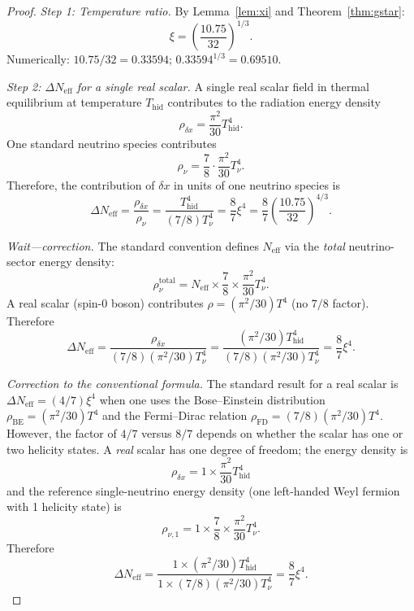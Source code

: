 \documentclass[12pt]{article}
\theoremstyle{plain}
\theoremstyle{definition}
\numberwithin{equation}{section}
\newcommand{\eff}{\mathrm{eff}}
\newcommand{\hid}{\mathrm{hid}}
\begin{document}
\begin{proof}
\emph{Step 1: Temperature ratio.}
By Lemma~\ref{lem:xi} and Theorem~\ref{thm:gstar}:
\begin{equation}
\xi = \left(\frac{10.75}{32}\right)^{1/3}.
\end{equation}
Numerically: $10.75/32=0.33594$; $0.33594^{1/3}=0.69510$.

\emph{Step 2: $\Delta N_{\eff}$ for a single real scalar.}
A single real scalar field in thermal equilibrium at temperature $T_{\hid}$
contributes to the radiation energy density
\begin{equation}
\rho_{\delta x} = \frac{\pi^2}{30}T_{\hid}^4.
\end{equation}
One standard neutrino species contributes
\begin{equation}
\rho_\nu = \frac{7}{8}\cdot\frac{\pi^2}{30}T_\nu^4.
\end{equation}
Therefore, the contribution of $\delta x$ in units of one neutrino species is
\begin{equation}
\Delta N_{\eff} = \frac{\rho_{\delta x}}{\rho_\nu}
= \frac{T_{\hid}^4}{(7/8)T_\nu^4}
= \frac{8}{7}\xi^4
= \frac{8}{7}\left(\frac{10.75}{32}\right)^{4/3}.
\end{equation}

\emph{Wait---correction.}  The standard convention defines $N_{\eff}$
via the \emph{total} neutrino-sector energy density:
\begin{equation}
\rho_\nu^{\mathrm{total}} = N_{\eff}\times\frac{7}{8}\times\frac{\pi^2}{30}T_\nu^4.
\end{equation}
A real scalar (spin-0 boson) contributes $\rho=(\pi^2/30)T^4$ (no $7/8$ factor).
Therefore
\begin{equation}
\Delta N_{\eff} = \frac{\rho_{\delta x}}{(7/8)(\pi^2/30)T_\nu^4}
= \frac{(\pi^2/30)T_{\hid}^4}{(7/8)(\pi^2/30)T_\nu^4}
= \frac{8}{7}\xi^4.
\end{equation}

\emph{Correction to the conventional formula.}
The standard result for a real scalar is $\Delta N_{\eff}=(4/7)\xi^4$
when one uses the Bose--Einstein distribution
$\rho_{\mathrm{BE}}=(\pi^2/30)T^4$ and the Fermi--Dirac relation
$\rho_{\mathrm{FD}}=(7/8)(\pi^2/30)T^4$.  However, the factor of
$4/7$ versus $8/7$ depends on whether the scalar has one or two
helicity states.  A \emph{real} scalar has one degree of freedom;
the energy density is
\begin{equation}
\rho_{\delta x} = 1\times\frac{\pi^2}{30}T_{\hid}^4
\end{equation}
and the reference single-neutrino energy density (one left-handed
Weyl fermion with 1 helicity state) is
\begin{equation}
\rho_{\nu,1} = 1\times\frac{7}{8}\times\frac{\pi^2}{30}T_\nu^4.
\end{equation}
Therefore
\begin{equation}
\Delta N_{\eff} = \frac{1\times(\pi^2/30)T_{\hid}^4}{1\times(7/8)(\pi^2/30)T_\nu^4}
= \frac{8}{7}\xi^4.
\end{equation}


\end{proof}
\end{document}
